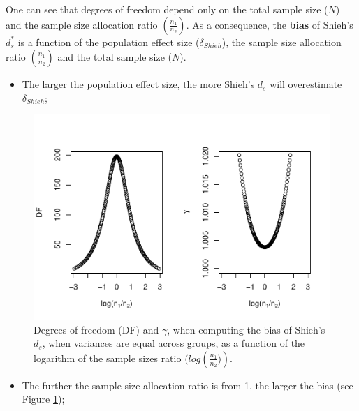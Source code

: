 \documentclass[
  english,
  man]{apa6}
\providecommand{\tightlist}{%
  \setlength{\itemsep}{0pt}\setlength{\parskip}{0pt}}
\begin{document}
One can see that degrees of freedom depend only on the total sample size (\(N\)) and the sample size allocation ratio \(\left( \frac{n_1}{n_2}\right)\). As a consequence, the \textbf{bias} of Shieh's \(d^*_s\) is a function of the population effect size (\(\delta_{Shieh}\)), the sample size allocation ratio \(\left( \frac{n_1}{n_2}\right)\) and the total sample size (\(N\)).

\begin{itemize}
\tightlist
\item
  The larger the population effect size, the more Shieh's \(d_s\) will overestimate \(\delta_{Shieh}\);
\end{itemize}

\begin{figure}
\centering
\includegraphics{Theoretical-Bias-of-all-estimators-as-a-function-of-population-parameters_files/figure-latex/biasshiehhomNratio2-1.pdf}
\caption{\label{fig:biasshiehhomNratio2}Degrees of freedom (DF) and \(\gamma\), when computing the bias of Shieh's \(d_s\), when variances are equal across groups, as a function of the logarithm of the sample sizes ratio \((log \left(\frac{n_1}{n_2})\right)\).}
\end{figure}

\begin{itemize}
\tightlist
\item
  The further the sample size allocation ratio is from 1, the larger the bias (see Figure \ref{fig:biasshiehhomNratio2});
\end{itemize}
\end{document}
